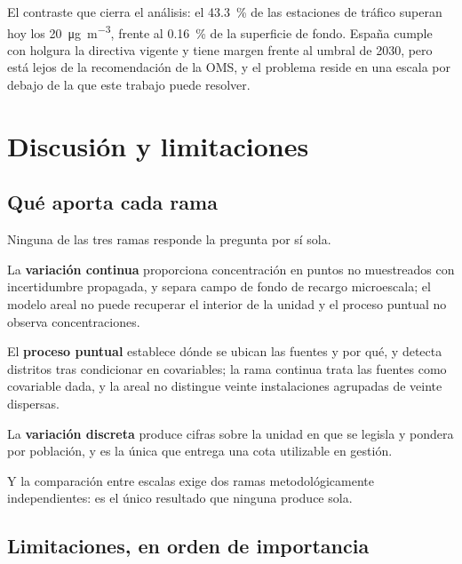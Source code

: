 \documentclass[11pt,a4paper]{article}
\begin{document}
El contraste que cierra el análisis: el \SI{43.3}{\percent} de las estaciones
de tráfico superan hoy los \SI{20}{\micro\gram\per\cubic\metre}, frente al
\SI{0.16}{\percent} de la superficie de fondo. España cumple con holgura la
directiva vigente y tiene margen frente al umbral de 2030, pero está lejos de
la recomendación de la OMS, y el problema reside en una escala por debajo de la
que este trabajo puede resolver.

\section{Discusión y limitaciones}

\subsection*{Qué aporta cada rama}

Ninguna de las tres ramas responde la pregunta por sí sola.

La \textbf{variación continua} proporciona concentración en puntos no
muestreados con incertidumbre propagada, y separa campo de fondo de recargo
microescala; el modelo areal no puede recuperar el interior de la unidad y el
proceso puntual no observa concentraciones.

El \textbf{proceso puntual} establece dónde se ubican las fuentes y por qué, y
detecta distritos tras condicionar en covariables; la rama continua trata las
fuentes como covariable dada, y la areal no distingue veinte instalaciones
agrupadas de veinte dispersas.

La \textbf{variación discreta} produce cifras sobre la unidad en que se legisla
y pondera por población, y es la única que entrega una cota utilizable en
gestión.

Y la comparación entre escalas exige dos ramas metodológicamente
independientes: es el único resultado que ninguna produce sola.

\subsection*{Limitaciones, en orden de importancia}
\end{document}

